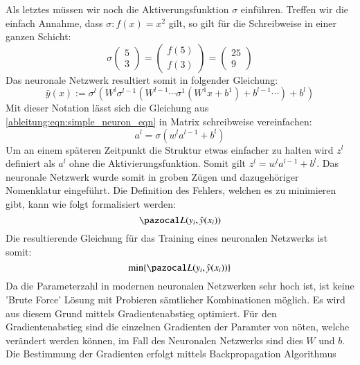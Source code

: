 Als letztes müssen wir noch die Aktiverungsfunktion $\sigma$ einführen. Treffen wir die einfach Annahme, dass $\sigma: f(x) = x^2$ gilt, so gilt für die Schreibweise in einer ganzen Schicht:
\begin{equation}
\sigma \begin{pmatrix} 5 \\ 3 \end{pmatrix} =  \begin{pmatrix} f(5) \\ f(3) \end{pmatrix} =  \begin{pmatrix} 25 \\ 9 \end{pmatrix}
\end{equation}
Das neuronale Netzwerk resultiert somit in folgender Gleichung:
\begin{equation}
	\hat{y}(x):= \sigma^{l}(W^{l}\sigma^{l-1}(W^{l-1}\cdots \sigma^{1}(W^{1}x+b^{1}) + b^{l-1} \cdots ) + b^{l})
\end{equation}
Mit dieser Notation lässt sich die Gleichung aus \ref{ableitung:eqn:simple_neuron_eqn} in Matrix schreibweise vereinfachen:
\begin{equation}
	a^{l} = \sigma \left(w^{l}a^{l-1}+b^l \right)
\end{equation}
Um an einem späteren Zeitpunkt die Struktur etwas einfacher zu halten wird $z^l$ definiert als $a^l$ ohne die Aktivierungsfunktion. Somit gilt $z^l = w^l a^{l-1} + b^l$.
Das neuronale Netzwerk wurde somit in groben Zügen und dazugehöriger Nomenklatur eingeführt. Die Definition des Fehlers, welchen es zu minimieren gibt, kann wie folgt formalisiert werden:
\begin{equation}
	\Lb(y_{i},\hat{y}(x_{i}))
\end{equation}
Die resultierende Gleichung für das Training eines neuronalen Netzwerks ist somit:
\begin{equation}
	\min \{ \Lb(y_{i},\hat{y}(x_{i})) \}
\end{equation}
Da die Parameterzahl in modernen neuronalen Netzwerken sehr hoch ist, ist keine 'Brute Force' Lösung mit Probieren sämtlicher Kombinationen möglich. Es wird aus diesem Grund mittels Gradientenabstieg optimiert. Für den Gradientenabstieg sind die einzelnen Gradienten der Paramter von nöten, welche verändert werden können, im Fall des Neuronalen Netzwerks sind dies $W$ und $b$. 
Die Bestimmung der Gradienten erfolgt mittels Backpropagation Algorithmus

